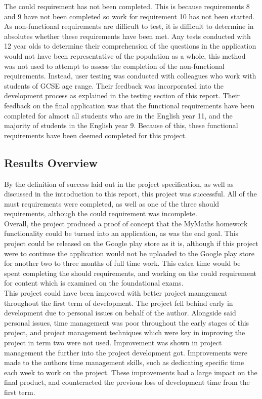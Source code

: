 \documentclass{article}
\begin{document}
The could requirement has not been completed. This is because requirements 8 and 9 have not been completed so work for requirement 10 has not been started. \\

As non-functional requirements are difficult to test, it is difficult to determine in absolutes whether these requirements have been met. Any tests conducted with 12 year olds to determine their comprehension of the questions in the application would not have been representative of the population as a whole, this method was not used to attempt to assess the completion of the non-functional requirements. Instead, user testing was conducted with colleagues who work with students of GCSE age range. Their feedback was incorporated into the development process as explained in the testing section of this report. Their feedback on the final application was that the functional requirements have been completed for almost all students who are in the English year 11, and the majority of students in the English year 9. Because of this, these functional requirements have been deemed completed for this project. \\

\subsection{Results Overview}

By the definition of success laid out in the project specification, as well as discussed in the introduction to this report, this project was successful. All of the must requirements were completed, as well as one of the three should requirements, although the could requirement was incomplete. \\

Overall, the project produced a proof of concept that the MyMaths homework functionality could be turned into an application, as was the end goal. This project could be released on the Google play store as it is, although if this project were to continue the application would not be uploaded to the Google play store for another two to three months of full time work. This extra time would be spent completing the should requirements, and working on the could requirement for content which is examined on the foundational exams. \\

This project could have been improved with better project management throughout the first term of development. The project fell behind early in development due to personal issues on behalf of the author. Alongside said personal issues, time management was poor throughout the early stages of this project, and project management techniques which were key in improving the project in term two were not used. Improvement was shown in project management the further into the project development got. Improvements were made to the authors time management skills, such as dedicating specific time each week to work on the project. These improvements had a large impact on the final product, and counteracted the previous loss of development time from the first term. \\
\end{document}
